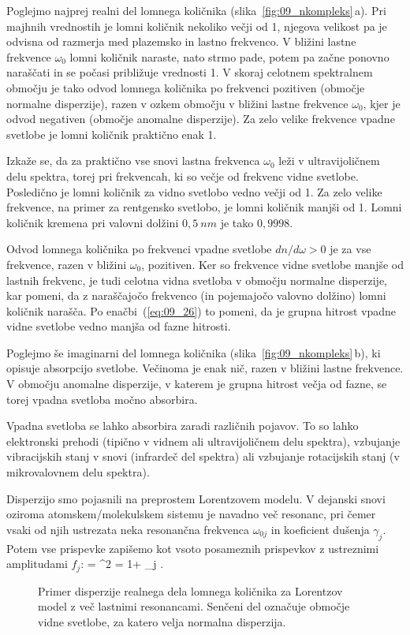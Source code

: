 Poglejmo najprej realni del lomnega količnika (slika~\ref{fig:09_nkompleks}\,a). 
Pri majhnih vrednostih je lomni količnik nekoliko večji od 1, 
njegova velikost pa je odvisna od razmerja med plazemsko in lastno frekvenco.
V bližini lastne frekvence $\omega_0$ lomni količnik naraste, nato strmo pade, potem pa 
začne ponovno naraščati in se počasi približuje vrednosti 1. V skoraj celotnem 
spektralnem območju je tako odvod lomnega količnika po frekvenci pozitiven 
(območje normalne disperzije), razen v ozkem območju v bližini lastne 
frekvence $\omega_0$, kjer je odvod negativen (območje anomalne disperzije). 
Za zelo velike frekvence vpadne svetlobe je lomni količnik praktično enak 1.

Izkaže se, da za praktično vse snovi lastna frekvenca $\omega_0$
leži v ultravijoličnem delu spektra, torej pri frekvencah, ki so večje od
frekvenc vidne svetlobe. Posledično je lomni količnik za vidno svetlobo 
vedno večji od 1. Za zelo velike frekvence, na primer za rentgensko svetlobo,
je lomni količnik manjši od 1. Lomni količnik kremena pri valovni 
dolžini $0,5~\si{nm}$ je tako $0,9998$. 

Odvod lomnega količnika po frekvenci vpadne svetlobe $dn/d\omega >0$
je za vse frekvence, razen v bližini $\omega_0$, pozitiven. 
Ker so frekvence vidne svetlobe manjše od lastnih frekvenc, je tudi celotna
vidna svetloba v območju normalne disperzije, kar pomeni, da z naraščajočo
frekvenco (in pojemajočo valovno dolžino) lomni količnik narašča. 
Po enačbi~(\ref{eq:09_26}) to pomeni, da je grupna hitrost vpadne vidne 
svetlobe vedno manjša od fazne hitrosti. 

Poglejmo še imaginarni del lomnega količnika (slika~\ref{fig:09_nkompleks}\,b), ki 
opisuje absorpcijo svetlobe. Večinoma je enak nič, razen v bližini lastne frekvence. 
V območju anomalne disperzije, v katerem je grupna hitrost večja od fazne, se 
torej vpadna svetloba močno absorbira. 

\begin{remark}
Vpadna svetloba se lahko absorbira zaradi različnih pojavov. To so lahko 
elektronski prehodi (tipično v vidnem ali ultravijoličnem delu spektra), 
vzbujanje vibracijskih stanj v snovi (infrardeč del spektra) ali 
vzbujanje rotacijskih stanj (v mikrovalovnem delu spektra).
\end{remark}

Disperzijo smo pojasnili na preprostem Lorentzovem modelu.
V dejanski snovi oziroma atomskem/molekulskem sistemu je navadno več resonanc, pri čemer
vsaki od njih ustrezata neka resonančna frekvenca $\omega_{0j}$ in koeficient
dušenja $\gamma_j$. Potem vse prispevke zapišemo kot vsoto posameznih prispevkov 
z ustreznimi amplitudami $f_j$:
\beq
\varepsilon = ^2 = 1+ \sum_j .
\label{eq:09_27}
\eeq
\begin{figure}[h!]
\centering
\def\svgwidth{140truemm} 

\caption{Primer disperzije realnega dela lomnega količnika za Lorentzov model 
z več lastnimi resonancami. Senčeni del označuje območje vidne svetlobe, 
za katero velja normalna disperzija.}
\label{fig:09_disp_multi}
\end{figure}

